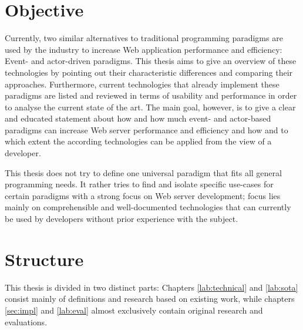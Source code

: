 \section{Objective}
Currently, two similar alternatives to traditional programming paradigms are used by the industry to increase Web application performance and efficiency: Event- and actor-driven paradigms. This thesis aims to give an overview of these technologies by pointing out their characteristic differences and comparing their approaches. Furthermore, current technologies that already implement these paradigms are listed and reviewed in terms of usability and performance in order to analyse the current state of the art. The main goal, however, is to give a clear and educated statement about how and how much event- and actor-based paradigms can increase Web server performance and efficiency and how and to which extent the according technologies can be applied from the view of a developer. 

This thesis does not try to define one universal paradigm that fits all general programming needs. It rather tries to find and isolate specific use-cases for certain paradigms with a strong focus on Web server development; focus lies mainly on comprehensible and well-documented technologies that can currently be used by developers without prior experience with the subject.

\section{Structure}
This thesis is divided in two distinct parts: Chapters \ref{lab:technical} and \ref{lab:sota} consist mainly of definitions and research based on existing work, while chapters \ref{sec:impl} and \ref{lab:eval} almost exclusively contain original research and evaluations.

